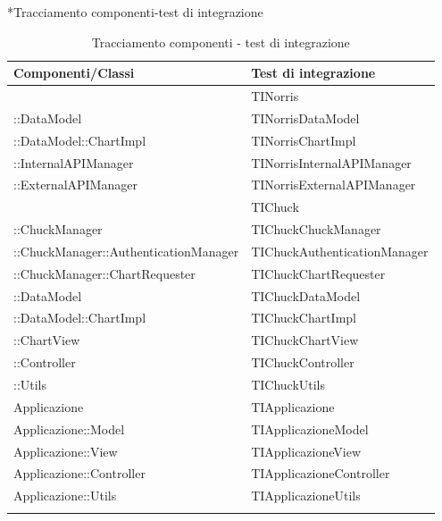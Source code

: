 	*{Tracciamento componenti-test di integrazione}


	\begin{longtabu}{| X | X[0.8] |}

			\hline
			\rowfont{\bf}
			Componenti/Classi	&	Test di integrazione \\ \hline 
			\endhead


			 & TINorris \\ \hline 
			::DataModel & TINorrisDataModel \\ \hline 
			::DataModel::ChartImpl & TINorrisChartImpl \\ \hline 
			::InternalAPIManager & TINorrisInternalAPIManager \\ \hline 
			::ExternalAPIManager & TINorrisExternalAPIManager \\ \hline 
			 & TIChuck \\ \hline 
			::ChuckManager & TIChuckChuckManager \\ \hline 
			::ChuckManager::AuthenticationManager & TIChuckAuthenticationManager \\ \hline 
			::ChuckManager::ChartRequester & TIChuckChartRequester \\ \hline 
			::DataModel & TIChuckDataModel \\ \hline 
			::DataModel::ChartImpl & TIChuckChartImpl \\ \hline 
			::ChartView & TIChuckChartView \\ \hline 
			::Controller & TIChuckController \\ \hline 
			::Utils & TIChuckUtils \\ \hline 
			Applicazione & TIApplicazione \\ \hline 
			Applicazione::Model & TIApplicazioneModel \\ \hline 
			Applicazione::View & TIApplicazioneView \\ \hline 
			Applicazione::Controller & TIApplicazioneController \\ \hline 
			Applicazione::Utils & TIApplicazioneUtils \\ \hline 




	\caption{Tracciamento componenti - test di integrazione}

\end{longtabu}
